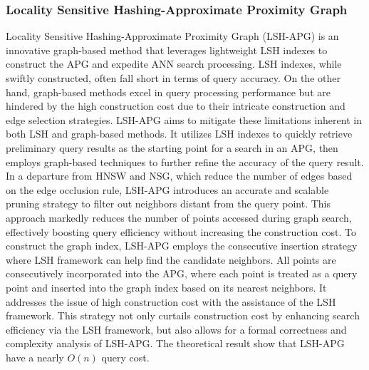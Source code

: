 \documentclass[11pt]{article}
\begin{document}
\subsubsection{{Locality Sensitive Hashing-Approximate Proximity Graph}}
Locality Sensitive Hashing-Approximate Proximity Graph (LSH-APG) \cite{DBLP:journals/pvldb/ZhaoTHZZ23} is an innovative graph-based method that leverages lightweight LSH indexes to construct the APG and expedite ANN search processing. 
LSH indexes, while swiftly constructed, often fall short in terms of query accuracy. On the other hand, graph-based methods excel in query processing performance but are hindered by the high construction cost due to their intricate construction and edge selection strategies. 
LSH-APG aims to mitigate these limitations inherent in both LSH and graph-based methods. It utilizes LSH indexes to quickly retrieve preliminary query results as the starting point for a search in an APG, then employs graph-based techniques to further refine the accuracy of the query result. 
In a departure from HNSW and NSG, which reduce the number of edges based on the edge occlusion rule, LSH-APG introduces an accurate and scalable pruning strategy to filter out neighbors distant from the query point. This approach markedly reduces the number of points accessed during graph search, effectively boosting query efficiency without increasing the construction cost. 
To construct the graph index, LSH-APG employs the consecutive insertion strategy where LSH framework can help find the candidate neighbors. All points are consecutively incorporated into the APG, where each point is treated as a query point and inserted into the graph index based on its nearest neighbors. It addresses the issue of high construction cost with the assistance of the LSH framework.
This strategy not only curtails construction cost by enhancing search efficiency via the LSH framework, but also allows for a formal correctness and complexity analysis of LSH-APG. The theoretical result show that LSH-APG have a nearly $O(n)$ query cost. 
\end{document}
